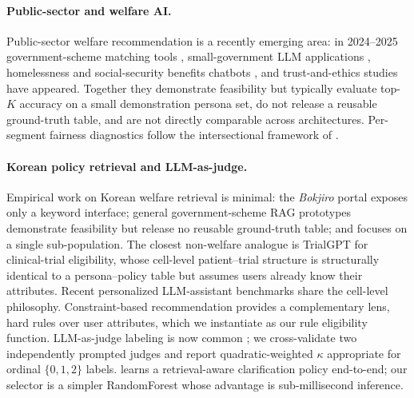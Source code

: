 \documentclass{article}
\begin{document}
\paragraph{Public-sector and welfare AI.}
Public-sector welfare recommendation is a recently emerging area:
in 2024--2025 government-scheme matching tools
\citep{kim_2024_govt_scheme_rag}, small-government LLM applications
\citep{huggins_daines_2024_small_gov_llm}, homelessness and
social-security benefits chatbots
\citep{nelson2024llm_homelessness,hhs2024benefits_ai}, and
trust-and-ethics studies \citep{kaun_2025_public_sector_chatbots}
have appeared. Together they demonstrate feasibility but typically
evaluate top-$K$ accuracy on a small demonstration persona set, do
not release a reusable ground-truth table, and are not directly
comparable across architectures. Per-segment fairness diagnostics
follow the intersectional framework of \citet{wang_2024_itfr_www}.

\paragraph{Korean policy retrieval and LLM-as-judge.}
Empirical work on Korean welfare retrieval is minimal: the
\emph{Bokjiro} portal exposes only a keyword interface; general
government-scheme RAG prototypes \citep{kim_2024_govt_scheme_rag}
demonstrate feasibility but release no reusable ground-truth table;
and \citet{ban2025welfare_disabled} focuses on a single
sub-population.
The closest non-welfare analogue is TrialGPT
\citep{jin_2024_trialgpt} for clinical-trial eligibility, whose
cell-level patient--trial structure is structurally identical to a
persona--policy table but assumes users already know their
attributes. Recent personalized LLM-assistant benchmarks
\citep{liu2025personalens} share the cell-level philosophy.
Constraint-based recommendation
\citep{jannach_2015_constraint_recsys,felfernig_2023_rdf_constraint_rec}
provides a complementary lens, hard rules over user attributes,
which we instantiate as our rule eligibility function. LLM-as-judge
labeling is now common
\citep{zheng2023mtbench,judges_verdict2025}; we cross-validate two
independently prompted judges and report quadratic-weighted
$\kappa$ \citep{cohen1968weightedkappa} appropriate for ordinal
$\{0,1,2\}$ labels. \citet{andukuri2024clarinet} learns a
retrieval-aware clarification policy end-to-end; our selector is a
simpler RandomForest whose advantage is sub-millisecond inference.

\end{document}
